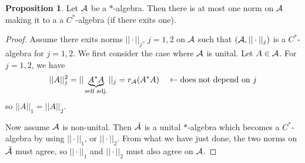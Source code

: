 \documentclass[10pt,english,a4paper]{article}
\theoremstyle{definition}
\newtheorem*{proposition}{Proposition}
\begin{document}
\begin{proposition}
    Let $\mathcal{A}$ be a $*$-algebra. Then there is at most one norm on $\mathcal{A}$ making
it to a a $C^*$-algebra (if there exits one).
\end{proposition}
\begin{proof}
    Assume there exits norms $||\cdot||_{j}$, $j =1,2$ on $\mathcal{A}$ 
such that $(\mathcal{A},||\cdot||_{j})$ is a $C^*$-algebra for $j=1,2$.
We first consider the case where $\mathcal{A}$ is unital. Let $A \in \mathcal{A}$. For
$j=1,2$, we have 
\[
||A||_{j}^{2} = ||\underbrace{A^*A}_{\text{self adj.}}
||_{j} = r_{\mathcal{A}}(A^*A) \quad \leftarrow\text{does not depend on $j$}
\]
so $||A||_1 = ||A||_2$.

Now assume $\mathcal{A}$ is non-unital. Then $\tilde{\mathcal{A}}$ is a unital $*$-algebra which
becomes a $C^*$-algebra by using $||\cdot||_1$, or $||\cdot||_2$. From what we 
have just done, the two norms on $\tilde{\mathcal{A}}$ must agree, so $||\cdot||_1$ and 
$||\cdot||_2$ must also agree on $\mathcal{A}$.
\end{proof}
\end{document}
